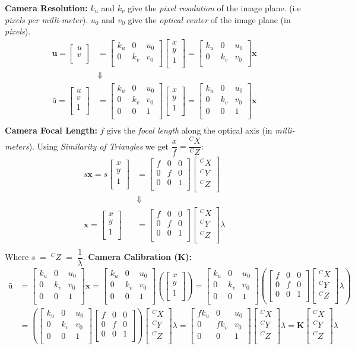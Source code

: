 \documentclass[a4paper,10pt]{article}
\newcommand{\sNHu}{\ensuremath{\textbf{u}}}
\newcommand{\sHu}{\ensuremath{\textbf{\~{u}}}}
\newcommand{\sHx}{\ensuremath{\textbf{\~{x}}}}
\newcommand{\sNHK}{\ensuremath{\textbf{K}}}
\newcommand{\vNHuv}{\ensuremath{\left[\begin{array}{c}u\\v\\\end{array}\right]}}
\newcommand{\vHuv}{\ensuremath{\left[\begin{array}{c}u\\v\\1\\\end{array}\right]}}
\newcommand{\vHxy}{\ensuremath{\left[\begin{array}{c}x\\y\\1\\\end{array}\right]}}
\newcommand{\mNHkuv}{\ensuremath{\left[\begin{array}{ccc}k_u & 0 & u_0\\0 & k_v & v_0\\\end{array}\right]}}
\newcommand{\mHkuv}{\ensuremath{\left[\begin{array}{ccc}k_u & 0 & u_0\\0 & k_v & v_0\\ 0 & 0 & 1\\\end{array}\right]}}
\newcommand{\mNHf}{\ensuremath{\left[\begin{array}{ccc}f & 0 & 0\\0 & f & 0\\0 & 0 & 1\\\end{array}\right]}}
\newcommand{\vNHcx}{\ensuremath{\left[\begin{array}{c}^CX\\^CY\\^CZ\\\end{array}\right]}}
\newcommand{\mHfkuv}{\ensuremath{\left[\begin{array}{ccc}fk_u & 0 & u_0\\0 & fk_v & v_0\\ 0 & 0 & 1\\\end{array}\right]}}
\begin{document}
\textbf{Camera Resolution:}
\newline\noindent\newline\noindent
$k_u$ and $k_v$ give the \textit{pixel resolution} of the image plane. (i.e \textit{pixels per milli-meter}).
$u_0$ and $v_0$ give the \textit{optical center} of the image plane (in \textit{pixels}).
\newline\noindent\newline\noindent
\begin{equation}
\begin{split}
\sNHu = \vNHuv &= \mNHkuv\vHxy = \mNHkuv\sHx\\
& \Downarrow 
\\
\sHu = \vHuv &= \mHkuv\vHxy = \mHkuv\sHx\\
\end{split}
\end{equation}
\newline\noindent\newline\noindent
\textbf{Camera Focal Length:}
\newline\noindent\newline\noindent
$f$ givs the \textit{focal length} along the optical axis (in \textit{milli-meters}).
\newline\noindent\newline\noindent
Using \emph{Similarity of Triangles} we get $\dfrac{x}{f} = \dfrac{^CX}{^CZ}$: 
\begin{equation}
\begin{split}
s\sHx = s\vHxy &= \mNHf\vNHcx \\
& \Downarrow \\
\sHx = \vHxy &= \mNHf\vNHcx\lambda \\
\end{split}
\end{equation}
Where $s\;=\;^CZ\;=\;\dfrac{1}{\lambda}$.
\newpage\noindent
\textbf{Camera Calibration ($\sNHK$):}
\newline\noindent\newline\noindent
\begin{equation}
\begin{split}
\sHu &= \mHkuv\sHx = \mHkuv\left(\vHxy\right)=\mHkuv\left(\mNHf\vNHcx\lambda\right)\\
&=\left(\mHkuv\mNHf\right)\vNHcx\lambda=\mHfkuv\vNHcx\lambda=\sNHK\vNHcx\lambda\\\
\end{split}
\end{equation}
\newline\noindent\newline\noindent
\end{document}
